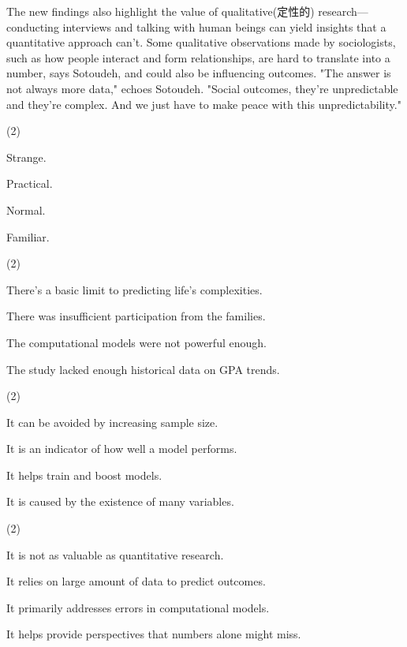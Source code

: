 \documentclass{英语试卷}
\begin{document}
\par The new findings also highlight the value of qualitative(定性的) research—conducting interviews and talking with human beings can yield insights that a quantitative approach can't. Some qualitative observations made by sociologists, such as how people interact and form relationships, are hard to translate into a number, says Sotoudeh, and could also be influencing outcomes. "The answer is not always more data," echoes Sotoudeh. "Social outcomes, they’re unpredictable and they’re complex. And we just have to make peace with this unpredictability."\par
{}
\begin{choices}(2)
  \item Strange.
  \item Practical.
  \item Normal.
  \item Familiar.
\end{choices}
\begin{choices}(2)
  \item There's a basic limit to predicting life's complexities.
  \item There was insufficient participation from the families.
  \item The computational models were not powerful enough.
  \item The study lacked enough historical data on GPA trends.
\end{choices}
\begin{choices}(2)
  \item It can be avoided by increasing sample size.
  \item It is an indicator of how well a model performs.
  \item It helps train and boost models.
  \item It is caused by the existence of many variables.
\end{choices}
\begin{choices}(2)
  \item It is not as valuable as quantitative research.
  \item It relies on large amount of data to predict outcomes.
  \item It primarily addresses errors in computational models.
  \item It helps provide perspectives that numbers alone might miss.
\end{choices}
\end{document}
